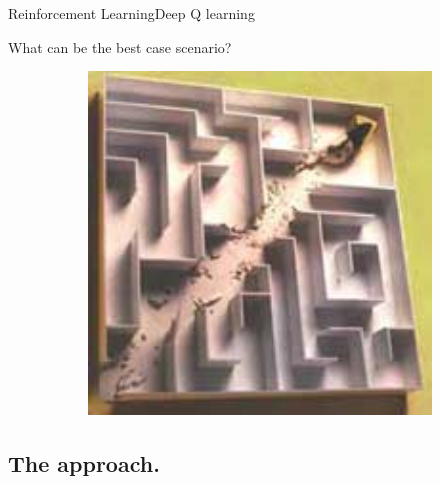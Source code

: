 \documentclass[10pt]{beamer}
\begin{document}
\begin{frame}{Reinforcement Learning}{Deep Q learning}
\item What can be the best case scenario?
\pause
\begin{figure}[!htb]
\centering
\begin{subfigure}[t]{0.5\linewidth}
\includegraphics[width=1\textwidth]{assets/meme.jpg}
\end{subfigure}
\vspace{0.1in}
\label{fig:tripEmb}
\end{figure}
\end{frame}




\subsection{The approach.}
\end{document}
